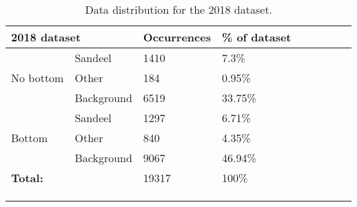 \begin{longtable}{lllllllll}
\caption[2018 data distribution]{Data distribution for the 2018 dataset.}
\\ \cline{1-4}
\multicolumn{2}{|l|}{\textbf{2018 dataset}} & \multicolumn{1}{l|}{Occurrences} & \multicolumn{1}{l|}{\% of dataset} &  &  &  &  &  \\ \cline{1-4}
\endfirsthead
%
\endhead
%
                     & Sandeel              & 1410                             & 7.3\%                              &  &  &  &  &  \\
No bottom            & Other                & 184                              & 0.95\%                             &  &  &  &  &  \\
                     & Background           & 6519                             & 33.75\%                            &  &  &  &  &  \\ \cline{1-4}
                     & Sandeel              & 1297                             & 6.71\%                             &  &  &  &  &  \\
Bottom               & Other                & 840                              & 4.35\%                             &  &  &  &  &  \\
                     & Background           & 9067                             & 46.94\%                            &  &  &  &  &  \\ \cline{1-4}
\multicolumn{2}{l}{\textbf{Total:}}         & 19317                            & 100\%                              &  &  &  &  &  \\ \cline{1-4}
                     &                      &                                  &                                    &  &  &  &  &  \\
                     &                      &                                  &                                    &  &  &  &  & 
\\ \label{data_distribution_2018_table}
\end{longtable}

